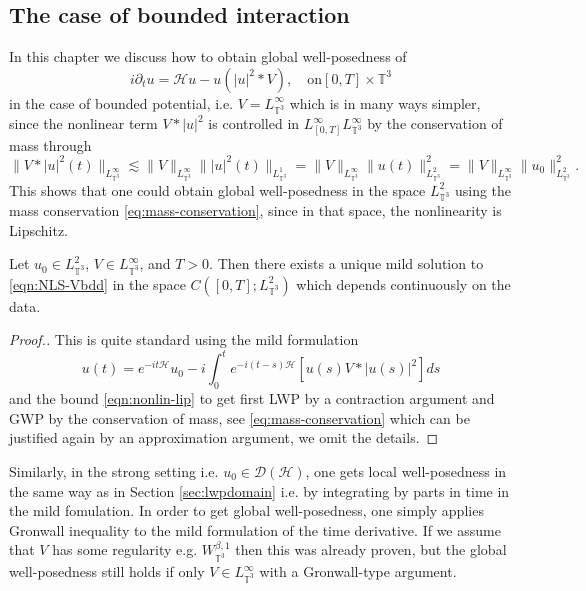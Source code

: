 \subsection{The case of bounded interaction}

In this chapter we discuss how to obtain global well-posedness of
\begin{equation}
  i \partial_t u = \mathcal{H} u - u (| u |^2 \ast V), \quad \mathrm{on} [0, T]
  \times \mathbb{T}^3 \label{eqn:NLS-Vbdd}
\end{equation}
in the case of bounded potential, i.e. $V = L_{\mathbb{T}^3}^{\infty}$ which
is in many ways simpler, since the nonlinear term $V \ast | u |^2$ is
controlled in $L_{[0, T]}^{\infty} L_{\mathbb{T}^3}^{\infty}$ by the
conservation of mass through
\begin{equation}
  \| V \ast | u |^2 (t) \|_{L_{\mathbb{T}^3}^{\infty}} \lesssim \| V
  \|_{L_{\mathbb{T}^3}^{\infty}} \| | u |^2 (t) \|_{L_{\mathbb{T}^3}^1} = \| V
  \|_{L_{\mathbb{T}^3}^{\infty}} \| u (t) \|^2_{L_{\mathbb{T}^3}^2} = \| V
  \|_{L_{\mathbb{T}^3}^{\infty}} \| u_0 \|^2_{L_{\mathbb{T}^3}^2} .
  \label{eqn:nonlin-lip}
\end{equation}
This shows that one could obtain global well-posedness in the space
$L_{\mathbb{T}^3}^2$ using the mass conservation \eqref{eq:mass-conservation},
since in that space, the nonlinearity is Lipschitz.

\begin{prop}
  \label{thm:VbddL2}Let $u_0 \in L_{\mathbb{T}^3}^2$, $V \in
  L_{\mathbb{T}^3}^{\infty}$, and $T > 0$. Then there exists a unique mild
  solution to \eqref{eqn:NLS-Vbdd} in the space $C ([0, T] ;
  L_{\mathbb{T}^3}^2)$ which depends continuously on the data.
\end{prop}

\begin{proof}[Proof.]
  This is quite standard using the mild formulation
  \begin{equation}
    u (t) = e^{- i t \mathcal{H}} u_0 - i \int^t_0 e^{- i (t - s) \mathcal{H}}
    [u (s) V \ast | u (s) |^2] d s \label{eqn:mildVinf}
  \end{equation}
  and the bound \eqref{eqn:nonlin-lip} to get first LWP by a contraction
  argument and GWP by the conservation of mass, see
  \eqref{eq:mass-conservation} which can be justified again by an
  approximation argument, we omit the details.
\end{proof}

Similarly, in the strong setting i.e. $u_0 \in \mathcal{D} (\mathcal{H})$, one
gets local well-posedness in the same way as in Section \ref{sec:lwpdomain}
i.e. by integrating by parts in time in the mild fomulation. In order to get
global well-posedness, one simply applies Gronwall inequality to the mild
formulation of the time derivative. If we assume that $V$ has some regularity
e.g. $W_{\mathbb{T}^3}^{\beta, 1}$ then this was already proven, but the
global well-posedness still holds if only $V \in L_{\mathbb{T}^3}^{\infty}$
with a Gronwall-type argument.

